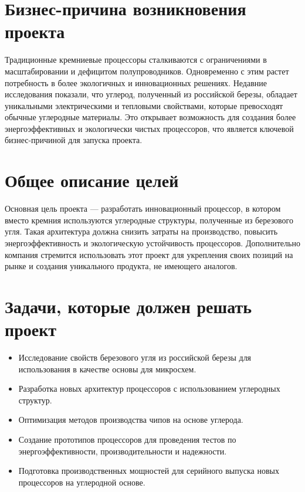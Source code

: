 \section{Бизнес-причина возникновения проекта}

Традиционные кремниевые процессоры сталкиваются с ограничениями
в масштабировании и дефицитом полупроводников.
Одновременно с этим растет потребность в более экологичных
и инновационных решениях. Недавние исследования показали,
что углерод, полученный из российской березы,
обладает уникальными электрическими и тепловыми свойствами,
которые превосходят обычные углеродные материалы.
Это открывает возможность для создания более энергоэффективных
и экологически чистых процессоров,
что является ключевой бизнес-причиной для запуска проекта.

\section{Общее описание целей}

Основная цель проекта --- разработать инновационный процессор,
в котором вместо кремния используются углеродные структуры,
полученные из березового угля.
Такая архитектура должна снизить затраты на производство,
повысить энергоэффективность и экологическую устойчивость процессоров.
Дополнительно компания стремится использовать этот проект
для укрепления своих позиций на рынке и создания уникального продукта,
не имеющего аналогов.

\section{Задачи, которые должен решать проект}

\begin{itemize}
	\item Исследование свойств березового угля из российской березы
		для использования в качестве основы для микросхем.
	\item Разработка новых архитектур процессоров
		с использованием углеродных структур.
	\item Оптимизация методов производства чипов на основе углерода.
	\item Создание прототипов процессоров
		для проведения тестов по энергоэффективности,
		производительности и надежности.
	\item Подготовка производственных мощностей
		для серийного выпуска новых процессоров на углеродной основе.
\end{itemize}


